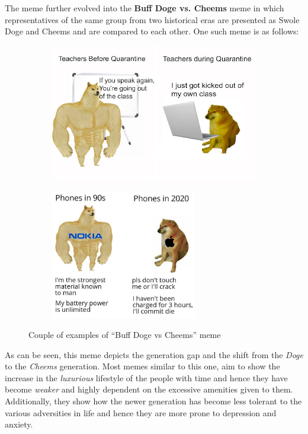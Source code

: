 \def\DevnagVersion{2.17}\documentclass{article}
\begin{document}
The meme further evolved into the \textbf{Buff Doge vs. Cheems} meme in which representatives of the same group from two historical eras are presented as Swole Doge and Cheems and are compared to each other. One such meme is as follows:
\begin{figure}[H]
    \centering
    \begin{subfigure}{0.45\textwidth}
        \centering
        \includegraphics[width=\textwidth]{figures/cheems_2.jpg}
    \end{subfigure}
    \begin{subfigure}{0.45\textwidth}
        \centering
        \includegraphics[width=0.7\textwidth]{figures/cheems_3.jpg}
    \end{subfigure}
    \caption{Couple of examples of ``Buff Doge vs Cheems'' meme}
\end{figure}

As can be seen, this meme depicts the generation gap and the shift from the \textit{Doge} to the \textit{Cheems} generation. Most memes similar to this one, aim to show the increase in the \textit{luxurious} lifestyle of the people with time and hence they have become \textit{weaker} and highly dependent on the excessive amenities given to them. Additionally, they show how the newer generation has become less tolerant to the various adversities in life and hence they are more prone to depression and anxiety.
\end{document}
